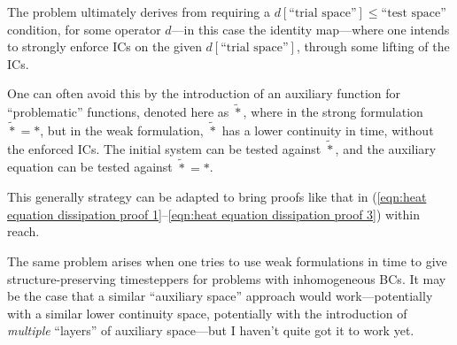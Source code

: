    The problem ultimately derives from requiring a $d[\text{``trial space''}]  \leqslant  \text{``test space''}$ condition, for some operator $d$—in this case the identity map—where one intends to strongly enforce ICs on the given $d[\text{``trial space''}]$, through some lifting of the ICs.

    One can often avoid this by the introduction of an auxiliary function for ``problematic'' functions, denoted here as $\widetilde{*}$, where in the strong formulation $\widetilde{*}  =  *$, but in the weak formulation, $\widetilde{*}$ has a lower continuity in time, without the enforced ICs. The initial system can be tested against $\widetilde{*}$, and the auxiliary equation can be tested against $\widetilde{*}  =  *$.

    This generally strategy can be adapted to bring proofs like that in (\ref{eqn:heat equation dissipation proof 1}–\ref{eqn:heat equation dissipation proof 3}) within reach.



    \begin{remark}
        The same problem arises when one tries to use weak formulations in time to give structure-preserving timesteppers for problems with inhomogeneous BCs. It may be the case that a similar ``auxiliary space'' approach would work—potentially with a similar lower continuity space, potentially with the introduction of \emph{multiple} ``layers'' of auxiliary space—but I haven't quite got it to work yet.
    \end{remark}

    